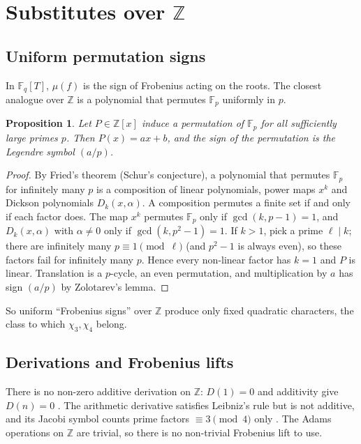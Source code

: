 \documentclass[11pt]{amsart}
\newtheorem{proposition}[theorem]{Proposition}
\theoremstyle{definition}
\theoremstyle{remark}
\newcommand{\Z}{\mathbb{Z}}
\newcommand{\F}{\mathbb{F}}
\begin{document}
\section{Substitutes over $\Z$}\label{sec:Z}

\subsection{Uniform permutation signs}
In $\F_q[T]$, $\mu(f)$ is the sign of Frobenius acting on the roots. The closest analogue over $\Z$ is a polynomial that permutes $\F_p$ uniformly in $p$.

\begin{proposition}\label{prop:fried}
Let $P\in\Z[x]$ induce a permutation of $\F_p$ for all sufficiently large primes $p$. Then $P(x)=ax+b$, and the sign of the permutation is the Legendre symbol $(a/p)$.
\end{proposition}

\begin{proof}
By Fried's theorem \cite{Fri70} (Schur's conjecture), a polynomial that permutes $\F_p$ for infinitely many $p$ is a composition of linear polynomials, power maps $x^k$ and Dickson polynomials $D_k(x,\alpha)$. A composition permutes a finite set if and only if each factor does. The map $x^k$ permutes $\F_p$ only if $\gcd(k,p-1)=1$, and $D_k(x,\alpha)$ with $\alpha\ne0$ only if $\gcd(k,p^2-1)=1$. If $k>1$, pick a prime $\ell\mid k$; there are infinitely many $p\equiv1\pmod\ell$ (and $p^2-1$ is always even), so these factors fail for infinitely many $p$. Hence every non-linear factor has $k=1$ and $P$ is linear. Translation is a $p$-cycle, an even permutation, and multiplication by $a$ has sign $(a/p)$ by Zolotarev's lemma.
\end{proof}

So uniform ``Frobenius signs'' over $\Z$ produce only fixed quadratic characters, the class to which $\chi_3,\chi_4$ belong.

\subsection{Derivations and Frobenius lifts}
There is no non-zero additive derivation on $\Z$: $D(1)=0$ and additivity give $D(n)=0$ \cite{Wan26b}. The arithmetic derivative satisfies Leibniz's rule but is not additive, and its Jacobi symbol counts prime factors $\equiv3\pmod4$ only \cite{Wan26b}. The Adams operations on $\Z$ are trivial, so there is no non-trivial Frobenius lift to use.
\end{document}
